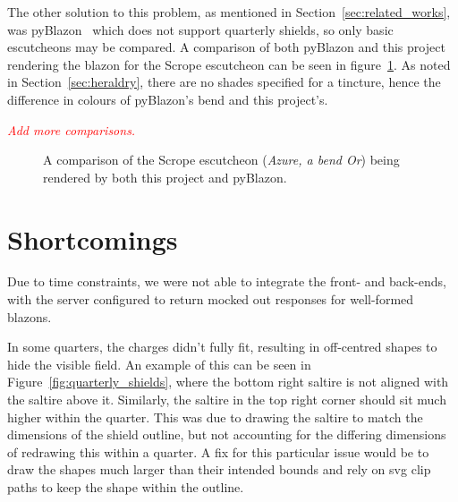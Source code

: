 \documentclass[nobib, a4paper, twoside, justified]{tufte-book}
\makeatletter
\newcommand{\svg}{\gls{svg}\@\xspace}
\newcommand{\todo}[1]{{\noindent\textcolor{Red}{\textit{\quad#1}}\par}}
\makeatother
\begin{document}
The other solution to this problem, as mentioned in Section~\ref{sec:related_works}, was
pyBlazon~\autocite{pyblazon} which does not support quarterly shields, so only basic
\glspl{escutcheon} may be compared. A comparison of both pyBlazon and this project rendering the
blazon for the Scrope \gls{escutcheon} can be seen in figure~\ref{fig:pyblazon_scrope_comparison}.
As noted in Section~\ref{sec:heraldry}, there are no shades specified for a tincture, hence the
difference in colours of pyBlazon's bend and this project's.

\todo{Add more comparisons.}

\begin{figure}
  \centering
  \qquad
  \caption{A comparison of the Scrope \gls{escutcheon} (\textit{Azure, a bend Or}) being rendered
  by both this project and pyBlazon.}%
  \label{fig:pyblazon_scrope_comparison}
\end{figure}

\section{Shortcomings}%
\label{sec:shortcomings}

Due to time constraints, we were not able to integrate the front- and back-ends, with the server
configured to return mocked out responses for well-formed blazons.

In some quarters, the charges didn't fully fit, resulting in off-centred shapes to hide the visible
field. An example of this can be seen in Figure~\ref{fig:quarterly_shields}, where the bottom right
saltire is not aligned with the saltire above it. Similarly, the saltire in the top right corner
should sit much higher within the quarter. This was due to drawing the saltire to match the
dimensions of the shield outline, but not accounting for the differing dimensions of redrawing this
within a quarter. A fix for this particular issue would be to draw the shapes much larger than
their intended bounds and rely on \svg clip paths to keep the shape within the outline.
\end{document}
